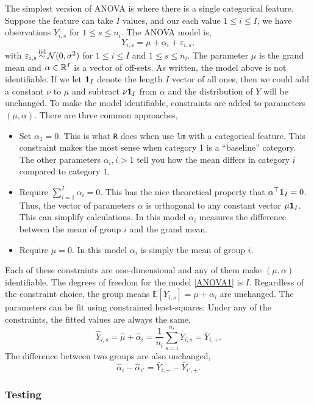 The simplest version of ANOVA is where there is a single categorical feature. Suppose the feature can take $I$ values, and our each value $1\le i \le I$, we have observations $Y_{i,s}$ for $1\le s \le n_i$. The ANOVA model is,
\begin{equation}\label{ANOVA1}
    Y_{i,s} = \mu + \alpha_{i} + \varepsilon_{i,s}, 
\end{equation}
with $\varepsilon_{i,s} \simiid \mathcal{N}(0,\sigma^2)$ for $1 \le i \le I$ and $1 \le s \le n_i$. The parameter $\mu$ is the grand mean and $\alpha \in \mathbb{R}^I$ is a vector of off-sets. As written, the model above is not identifiable. If we let $\mathbf 1_I$ denote the length $I$ vector of all ones, then we could add a constant $\nu$ to $\mu$ and subtract $\nu\mathbf 1_I$ from $\alpha$ and the distribution of $Y$ will be unchanged. To make the model identifiable, constraints are added to parameters $(\mu,\alpha)$. There are three common approaches,
\begin{itemize}
    \item Set $\alpha_1 = 0$. This is what \verb|R| does when use \verb|lm| with a categorical feature. This constraint makes the most sense when category 1 is a ``baseline'' category. The other parameters $\alpha_i, i > 1$ tell you how the mean differs in category $i$ compared to category $1$.
    \item Require $\sum_{i=1}^I \alpha_i = 0$. This has the nice theoretical property that $\alpha^\top \mathbf 1_I = 0$. Thus, the vector of parameters $\alpha$ is orthogonal to any constant vector $\mu \mathbf 1_I$. This can simplify calculations. In this model $\alpha_i$ measures the difference between the mean of group $i$ and the grand mean.
    \item Require $\mu = 0$. In this model $\alpha_i$ is simply the mean of group $i$.
\end{itemize}
Each of these constraints are one-dimensional and any of them make $(\mu,\alpha)$ identifiable. The degrees of freedom for the model \eqref{ANOVA1} is $I$. Regardless of the constraint choice, the group means $\mathbb{E}[Y_{i,s}] = \mu + \alpha_i$ are unchanged. The parameters can be fit using constrained least-squares. Under any of the constraints, the fitted values are always the same,
\[\hat{Y}_{i,s} = \hat{\mu}+\hat{\alpha}_i = \frac{1}{n_i}\sum_{s=i}^{n_s} Y_{i,s} = \bar{Y}_{i,+}. \]
The difference between two groups are also unchanged,
\[\hat{\alpha}_{i}-\hat{\alpha}_{i'} = \bar{Y}_{i,+} - \bar{Y}_{i',+}. \]

\subsubsection*{Testing}

